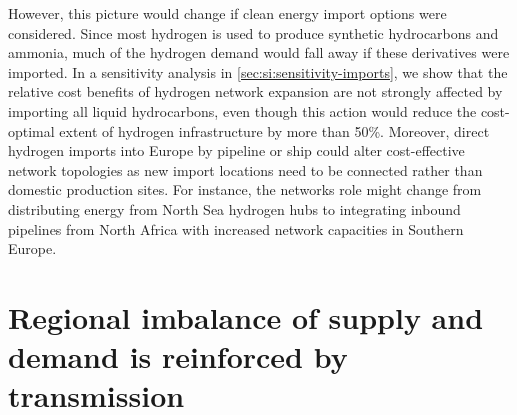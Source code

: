 However, this picture would change if clean energy import options were
considered. Since most hydrogen is used to produce synthetic hydrocarbons and
ammonia, much of the hydrogen demand would fall away if these derivatives were
imported. In a sensitivity analysis in \cref{sec:si:sensitivity-imports}, we
show that the relative cost benefits of hydrogen network expansion are not
strongly affected by importing all liquid hydrocarbons, even though this action
would reduce the cost-optimal extent of hydrogen infrastructure by more than
50\%. Moreover, direct hydrogen imports into Europe by pipeline or ship could
alter cost-effective network topologies as new import locations need to be
connected rather than domestic production sites. For instance, the networks role
might change from distributing energy from North Sea hydrogen hubs to
integrating inbound pipelines from North Africa with increased network
capacities in Southern Europe.\cite{wetzelGreenEnergy2023a}

\section*{Regional imbalance of supply and demand is reinforced by transmission}
\label{sec:imbalance}

